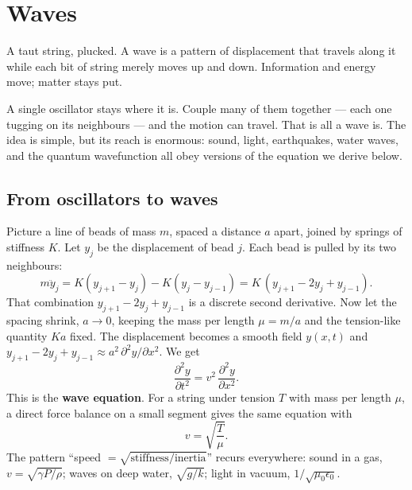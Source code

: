 \chapter{Waves}
\label{ch:waves}



\begin{prototype}
A taut string, plucked. A wave is a pattern of displacement that travels along it while each bit of string merely moves up and down. Information and energy move; matter stays put.
\end{prototype}

A single oscillator stays where it is. Couple many of them together --- each one tugging on its neighbours --- and the motion can travel. That is all a wave is. The idea is simple, but its reach is enormous: sound, light, earthquakes, water waves, and the quantum wavefunction all obey versions of the equation we derive below.

\section{From oscillators to waves}

Picture a line of beads of mass $m$, spaced a distance $a$ apart, joined by springs of stiffness $K$. Let $y_j$ be the displacement of bead $j$. Each bead is pulled by its two neighbours:
\[
  m\ddot y_j = K(y_{j+1} - y_j) - K(y_j - y_{j-1}) = K\,(y_{j+1} - 2y_j + y_{j-1}).
\]
That combination $y_{j+1}-2y_j+y_{j-1}$ is a discrete second derivative. Now let the spacing shrink, $a\to0$, keeping the mass per length $\mu = m/a$ and the tension-like quantity $Ka$ fixed. The displacement becomes a smooth field $y(x,t)$ and $y_{j+1}-2y_j+y_{j-1}\approx a^2\,\partial^2 y/\partial x^2$. We get
\[
  \frac{\partial^{2}y}{\partial t^{2}} = v^{2}\,\frac{\partial^{2}y}{\partial x^{2}} .
\]
This is the \textbf{wave equation}. For a string under tension $T$ with mass per length $\mu$, a direct force balance on a small segment gives the same equation with
\[
  v = \sqrt{\frac{T}{\mu}} .
\]
The pattern ``speed $= \sqrt{\text{stiffness}/\text{inertia}}$'' recurs everywhere: sound in a gas, $v=\sqrt{\gamma P/\rho}$; waves on deep water, $\sqrt{g/k}$; light in vacuum, $1/\sqrt{\mu_0\epsilon_0}$.

